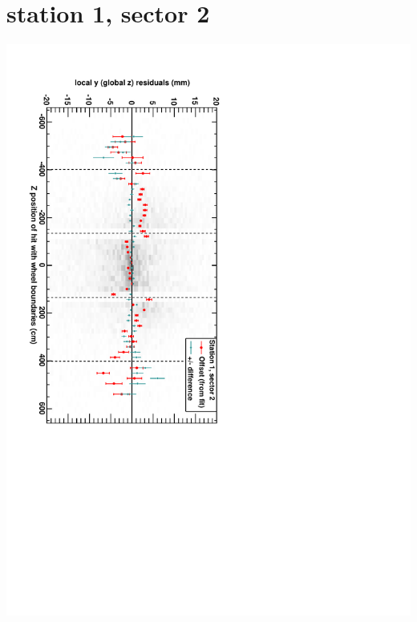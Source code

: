 \documentclass[compress]{beamer}
\begin{document}
\section*{station 1, sector 2}
\begin{frame} \vfill \mbox{\hspace{-1 cm}\includegraphics[height=1.2\linewidth, angle=90]{DTzVsZ_st1_sr02.pdf}} \end{frame}
\end{document}

